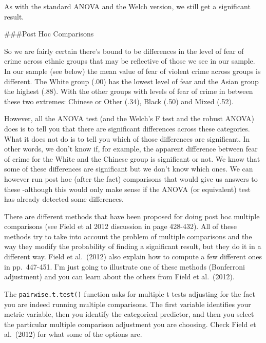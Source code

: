 \documentclass[]{book}
\newenvironment{Shaded}{\begin{snugshade}}{\end{snugshade}}
\newcommand{\DataTypeTok}[1]{\textcolor[rgb]{0.13,0.29,0.53}{#1}}
\newcommand{\KeywordTok}[1]{\textcolor[rgb]{0.13,0.29,0.53}{\textbf{#1}}}
\newcommand{\NormalTok}[1]{#1}
\newcommand{\OperatorTok}[1]{\textcolor[rgb]{0.81,0.36,0.00}{\textbf{#1}}}
\newcommand{\StringTok}[1]{\textcolor[rgb]{0.31,0.60,0.02}{#1}}
\theoremstyle{definition}
\theoremstyle{definition}
\theoremstyle{definition}
\theoremstyle{remark}
\begin{document}
As with the standard ANOVA and the Welch version, we still get a
significant result.

\#\#\#Post Hoc Comparisons

So we are fairly certain there's bound to be differences in the level of
fear of crime across ethnic groups that may be reflective of those we
see in our sample. In our sample (see below) the mean value of fear of
violent crime across groups is different. The White group (.00) has the
lowest level of fear and the Asian group the highest (.88). With the
other groups with levels of fear of crime in between these two extremes:
Chinese or Other (.34), Black (.50) and Mixed (.52).

However, all the ANOVA test (and the Welch's F test and the robust
ANOVA) does is to tell you that there are significant differences across
these categories. What it does not do is to tell you which of those
differences are significant. In other words, we don't know if, for
example, the apparent difference between fear of crime for the White and
the Chinese group is significant or not. We know that some of these
differences are significant but we don't know which ones. We can however
run post hoc (after the fact) comparisons that would give us answers to
these -although this would only make sense if the ANOVA (or equivalent)
test has already detected some differences.

There are different methods that have been proposed for doing post hoc
multiple comparisons (see Field et al 2012 discussion in page 428-432).
All of these methods try to take into account the problem of multiple
comparisons and the way they modify the probability of finding a
significant result, but they do it in a different way. Field et
al.~(2012) also explain how to compute a few different ones in
pp.~447-451. I'm just going to illustrate one of these methods
(Bonferroni adjustment) and you can learn about the others from Field et
al.~(2012).

The \texttt{pairwise.t.test()} function asks for multiple t tests
adjusting for the fact you are indeed running multiple comparisons. The
first variable identifies your metric variable, then you identify the
categorical predictor, and then you select the particular multiple
comparison adjustment you are choosing. Check Field et al.~(2012) for
what some of the options are.

\begin{Shaded}
\end{Shaded}
\end{document}
